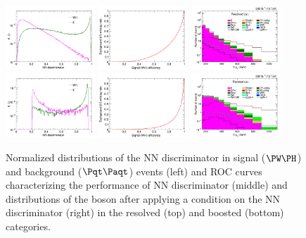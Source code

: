 \documentclass[a4paper,11pt]{article}
\newcommand{\Pt}{{{\Pqt}}\xspace}
\newcommand{\PAt}{{{{\Paqt}}}\xspace}
\begin{document}
\begin{figure}[hbtp]
\begin{center}
\includegraphics[width=0.3\textwidth]{Figures/New/RECO/Plot_WH_MVA_WH_fast_resolved.png}
\includegraphics[width=0.3\textwidth]{Figures/New/RECO/ROC_plot_TT_MVA_resolved.png}
\includegraphics[width=0.3\textwidth]{Figures/New/RECO/Plot_Resolved_SR_V_pt_sigpurity.png}
\includegraphics[width=0.3\textwidth]{Figures/New/RECO/Plot_WH_MVA_WH_fast_boosted.png}
\includegraphics[width=0.3\textwidth]{Figures/New/RECO/ROC_plot_TT_MVA_boosted.png}
\includegraphics[width=0.3\textwidth]{Figures/New/RECO/Plot_Boosted_SR_V_pt_sigpurity.png}
\end{center}
\caption{
Normalized distributions of the NN discriminator in signal ($\PW\PH$) and background ($\Pt\PAt$) events (left) and ROC curves characterizing the performance of NN discriminator (middle) and  distributions of the \PW boson \pt after applying a condition on the NN discriminator (right) in the resolved (top) and boosted (bottom) categories.
}
\label{fig:MVA}
\end{figure}
\end{document}
